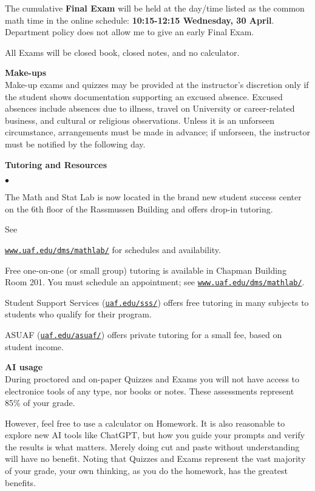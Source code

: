 \documentclass[12pt]{article}
\renewcommand{\emph}[1]{\textsf{\textbf{#1}}}
\newcommand{\localhead}[1]{\par\smallskip\textbf{#1} \smallskip\nobreak\\}%
\def\heading#1{\localhead{\large\emph{#1}}}
\newenvironment{clist}%
{\bgroup\parskip 0pt\begin{list}{$\bullet$}{\partopsep 4pt\topsep 0pt\itemsep -2pt}}%
{\end{list}\egroup}%
\begin{document}
The cumulative \emph{Final Exam} will be held at the day/time listed
as the common math time in the online schedule: \emph{10:15-12:15
Wednesday, 30 April}. Department policy does not allow me to give an
early Final Exam.

All Exams will be closed book, closed notes, and no calculator.

\heading{Make-ups}
Make-up exams and quizzes may be provided at the instructor's
discretion only if
the student shows documentation supporting an excused absence. Excused
absences include absences due to illness, travel on University or
career-related business, and cultural or religious
observations. Unless it is an unforseen circumstance, arrangements
must be made in advance; if unforseen, the instructor must be notified
by the following day.


\newpage

\heading{Tutoring and Resources}
\vskip -30pt\strut
\begin{clist}
    \item The Math and Stat Lab is now located in the brand new
      student success center on the 6th floor of the Rassmussen Building and
      offers drop-in tutoring.

	See 

	\href{http://www.uaf.edu/dms/mathlab/}{\texttt{www.uaf.edu/dms/mathlab/}} for schedules and availability.
	\item Free
one-on-one (or small group) tutoring is available in 
Chapman Building Room 201. You must schedule an
appointment; see \href{http://www.uaf.edu/dms/mathlab/}{\texttt{www.uaf.edu/dms/mathlab/}}.
	\item Student Support Services (\href{https://uaf.edu/sss/}{\texttt{uaf.edu/sss/}}) offers free tutoring in many subjects to students who qualify for their program.
	\item ASUAF (\href{https://uaf.edu/asuaf/}{\texttt{uaf.edu/asuaf/}}) offers private tutoring for a small fee, based on student income.
\end{clist}


\clearpage\newpage

\strut

\vspace{-12pt}

\heading{AI usage}
During proctored and on-paper Quizzes and Exams you will not have access to electronice tools of any type, nor books or notes.  These assessments represent 85\% of your grade.

However, feel free to use a calculator on Homework.  It is also reasonable to explore new AI tools like ChatGPT, but how you guide your prompts and verify the results is what matters.  Merely doing cut and paste without understanding will have no benefit.  Noting that Quizzes and Exams represent the vast majority of your grade, your own thinking, as you do the homework, has the greatest benefits.
\end{document}
